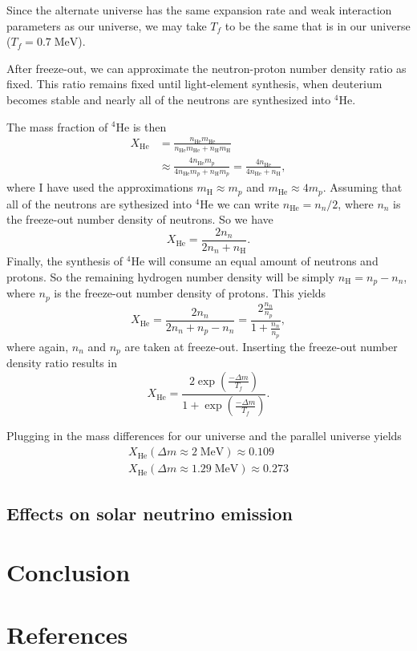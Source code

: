 \documentclass[%
 reprint,
 amsmath,amssymb,
 aps,
]{revtex4-1}
\begin{document}
Since the alternate universe has the same expansion rate and weak interaction parameters as our universe, we may take $T_f$ to be the same that is in our universe ($T_f = 0.7\; \text{MeV}$).

After freeze-out, we can approximate the neutron-proton number density ratio as fixed. This ratio remains fixed until light-element synthesis, when deuterium becomes stable and nearly all of the neutrons are synthesized into ${}^4\text{He}$.\cite{PhysRevD.65.123511}

The mass fraction of ${}^4\text{He}$ is then
\begin{align}
    X_\text{He} &= 
    \frac{n_\text{He} m_\text{He}}{n_\text{He} m_\text{He} + n_\text{H} m_\text{H}} \\
    &\approx \frac{4 n_\text{He} m_p}{4 n_\text{He} m_p + n_\text{H} m_p}
    = \frac{4 n_\text{He}}{4 n_\text{He} + n_\text{H}},
\end{align}
where I have used the approximations $m_\text{H} \approx m_p$ and $m_\text{He} \approx 4 m_p$. Assuming that all of the neutrons are sythesized into ${}^4\text{He}$ we can write $n_\text{He} = n_n / 2$, where $n_n$ is the freeze-out number density of neutrons. So we have
\begin{equation}
    X_\text{He} = \frac{2 n_n}{2 n_n + n_\text{H}}.
\end{equation}
Finally, the synthesis of ${}^4\text{He}$ will consume an equal amount of neutrons and protons. So the remaining hydrogen number density will be simply $n_\text{H} = n_p - n_n$, where $n_p$ is the freeze-out number density of protons. This yields
\begin{equation}
    X_\text{He} = \frac{2 n_n}{2 n_n + n_p - n_n}
    = \frac{2 \frac{n_n}{n_p}}{1 + \frac{n_n}{n_p}},
\end{equation}
where again, $n_n$ and $n_p$ are taken at freeze-out. Inserting the freeze-out number density ratio results in
\begin{equation}
    X_\text{He} =
    \frac{2 \exp \left( \frac{- \Delta m}{T_f} \right)}{1 + \exp \left( \frac{- \Delta m}{T_f} \right)}.
\end{equation}

Plugging in the mass differences for our universe and the parallel universe yields
\begin{align}
    X_\text{He}(\Delta m \approx 2 \; \text{MeV}) \approx 0.109 \\
    X_\text{He}(\Delta m \approx 1.29 \; \text{MeV}) \approx 0.273
\end{align}

\subsection{\label{sec:neutrinos}Effects on solar neutrino emission}

\section{\label{sec:conclusion}Conclusion}

\section{\label{sec:ref}References}

 

\end{document}

